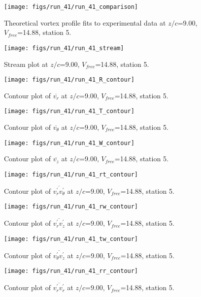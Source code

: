 \begin{figure}[H]
\centering
\texttt{[image: figs/run\_41/run\_41\_comparison]}
\caption{Theoretical vortex profile fits to experimental data at $z/c$=9.00, $V_{free}$=14.88, station 5.}
\end{figure}


\begin{figure}[H]
\centering
\texttt{[image: figs/run\_41/run\_41\_stream]}
\caption{Stream plot at $z/c$=9.00, $V_{free}$=14.88, station 5.}
\end{figure}


\begin{figure}[H]
\centering
\texttt{[image: figs/run\_41/run\_41\_R\_contour]}
\caption{Contour plot of $\overline{v_{r}}$ at $z/c$=9.00, $V_{free}$=14.88, station 5.}
\end{figure}


\begin{figure}[H]
\centering
\texttt{[image: figs/run\_41/run\_41\_T\_contour]}
\caption{Contour plot of $\overline{v_{\theta}}$ at $z/c$=9.00, $V_{free}$=14.88, station 5.}
\end{figure}


\begin{figure}[H]
\centering
\texttt{[image: figs/run\_41/run\_41\_W\_contour]}
\caption{Contour plot of $\overline{v_{z}}$ at $z/c$=9.00, $V_{free}$=14.88, station 5.}
\end{figure}


\begin{figure}[H]
\centering
\texttt{[image: figs/run\_41/run\_41\_rt\_contour]}
\caption{Contour plot of $\overline{v_{r}^{\prime} v_{\theta}^{\prime}}$ at $z/c$=9.00, $V_{free}$=14.88, station 5.}
\end{figure}


\begin{figure}[H]
\centering
\texttt{[image: figs/run\_41/run\_41\_rw\_contour]}
\caption{Contour plot of $\overline{v_{r}^{\prime} v_{z}^{\prime}}$ at $z/c$=9.00, $V_{free}$=14.88, station 5.}
\end{figure}


\begin{figure}[H]
\centering
\texttt{[image: figs/run\_41/run\_41\_tw\_contour]}
\caption{Contour plot of $\overline{v_{\theta}^{\prime} v_{z}^{\prime}}$ at $z/c$=9.00, $V_{free}$=14.88, station 5.}
\end{figure}


\begin{figure}[H]
\centering
\texttt{[image: figs/run\_41/run\_41\_rr\_contour]}
\caption{Contour plot of $\overline{v_{r}^{\prime} v_{r}^{\prime}}$ at $z/c$=9.00, $V_{free}$=14.88, station 5.}
\end{figure}



